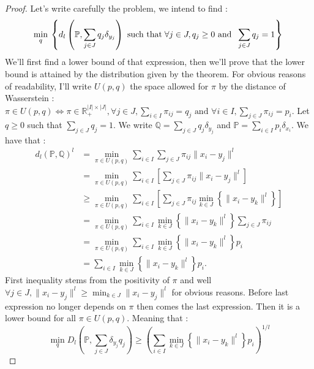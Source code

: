 \documentclass{amsart}
\newcommand{\RR}{\mathbb{R}}
\begin{document}
\begin{proof}
    Let's write carefully the problem, we intend to find :
    $$
        \min_{q}\:\left\{d_l\left(\mathbb{P},\sum_{j\in J}q_j\delta_{y_j}\right)\text{ such that} \; \forall j\in J, q_j\geq 0 \text{ and } \;\sum_{j\in J}q_j=1 \right\}\\
    $$
    We'll first find a lower bound of that expression, then we'll prove that the lower bound is attained by the distribution given by the theorem.
    \newline
    For obvious reasons of readability, I'll write $U\left(p,q\right)$ the space allowed for $\pi$ by the distance of Wasserstein :\newline
    $\pi\in U\left(p,q\right) \iff \pi\in\RR^{\lvert I\rvert \times\lvert J\vert}_+, \forall j\in J, \sum_{i\in I}\pi_{ij}=q_j \text{ and } \forall i\in I, \sum_{j\in J}\pi_{ij}=p_i$.
    \newline
    Let $q\geq 0$ such that $\sum_{j\in J}q_j=1$. We write $\mathbb{Q}=\sum_{j\in J}q_j\delta_{y_j}$ and $\mathbb{P}=\sum_{i\in I}p_i\delta_{x_i}$.  We have that :
    \begin{align*}
        d_l\left(\mathbb{P},\mathbb{Q}\right)^l&=            \min_{\pi\in U\left(p,q\right)}\sum_{i\in I}\sum_{j\in J}\pi_{ij}\lVert x_i-y_j\rVert^l \\ &= \min_{\pi\in U\left(p,q\right)}\sum_{i\in I}\left[\sum_{j\in J}\pi_{ij}\lVert x_i-y_j\rVert^l\right] \\
        &\geq \min_{\pi\in U\left(p,q\right)}\sum_{i\in I}\left[\sum_{j\in J}\pi_{ij}\min_{k\in J}\left\{\lVert x_i-y_k\lVert^l\right\}\right] \\ &= \min_{\pi\in U\left(p,q\right)}\sum_{i\in I}\min_{k\in J}\left\{\lVert x_i-y_k\lVert^l\right\}\sum_{j\in J}\pi_{ij} \\
        &=\min_{\pi\in U\left(p,q\right)}\sum_{i\in I}\min_{k\in J}\left\{\lVert x_i-y_k\lVert^l\right\}p_i \\& =\sum_{i\in I}\min_{k\in J}\left\{\lVert x_i-y_k\lVert^l\right\}p_i.
    \end{align*}
First inequality stems from the positivity of $\pi$ and well $\forall j\in J, \lVert x_i-y_j\rVert^l \geq \min_{k\in J}\lVert x_i-y_j\rVert^l$ for obvious reasons. Before last expression no longer depends on $\pi$ then comes the last expression. Then it is a lower bound for all $\pi\in U\left(p,q\right)$. Meaning that :
$$
\min_{q} D_l\left(\mathbb{P},\sum_{j\in J}\delta_{y_j}q_j\right) \geq \left(\sum_{i\in I}\min_{k\in J}\left\{\lVert x_i-y_k\lVert^l\right\}p_i\right)^{1/l}
$$
\newline


\end{proof}
\end{document}
